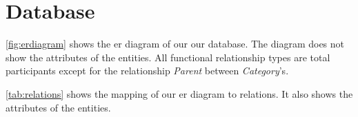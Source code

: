 \section{Database}\label{sec:design_database}


\autoref{fig:erdiagram} shows the \ac{er} diagram of our our database. The diagram does not show the attributes of the entities. All functional relationship types are total participants except for the relationship \textit{Parent} between \textit{Category}'s.

\autoref{tab:relations} shows the mapping of our \ac{er} diagram to relations. It also shows the attributes of the entities.


\newcommand{\relation}[1]{[\{ #1 \}]\\}
\newcommand{\us}{\textunderscore}

